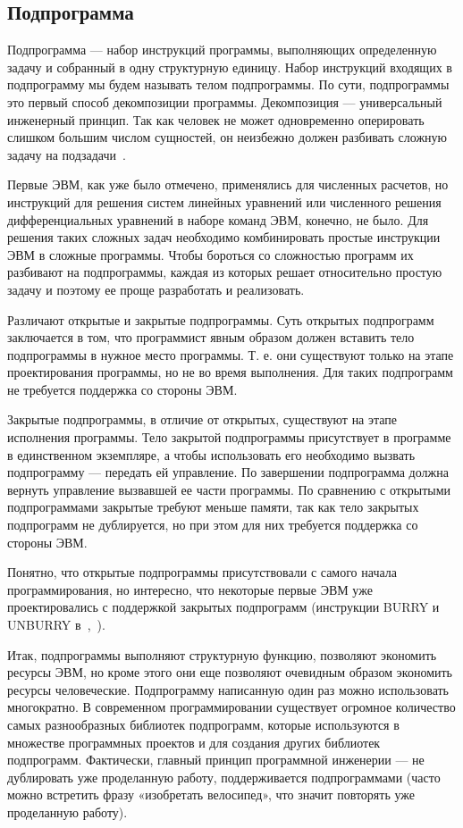 \subsection{Подпрограмма}

Подпрограмма — набор инструкций программы, выполняющих определенную задачу и собранный в одну структурную единицу. Набор инструкций входящих в подпрограмму мы будем называть телом подпрограммы. По сути, подпрограммы это первый способ декомпозиции программы. Декомпозиция — универсальный инженерный принцип. Так как человек не может одновременно оперировать слишком большим числом сущностей, он неизбежно должен разбивать сложную задачу на подзадачи~\cite{Miller}.

Первые ЭВМ, как уже было отмечено, применялись для численных расчетов, но инструкций для решения систем линейных уравнений или численного решения дифференциальных уравнений в наборе команд ЭВМ, конечно, не было. Для решения таких сложных задач необходимо комбинировать простые инструкции ЭВМ в сложные программы.  Чтобы бороться со сложностью программ их разбивают на подпрограммы, каждая из которых решает относительно простую задачу и поэтому ее проще разработать и реализовать.

Различают открытые и закрытые подпрограммы. Суть открытых подпрограмм заключается в том, что программист явным образом должен вставить тело подпрограммы в нужное место программы. Т. е. они существуют только на этапе проектирования программы, но не во время выполнения. Для таких подпрограмм не требуется поддержка со стороны ЭВМ.

Закрытые подпрограммы, в отличие от открытых, существуют на этапе исполнения программы. Тело закрытой подпрограммы присутствует в программе в единственном экземпляре, а чтобы использовать его необходимо вызвать подпрограмму — передать ей управление. По завершении подпрограмма должна вернуть управление вызвавшей ее части программы. По сравнению с открытыми подпрограммами закрытые требуют меньше памяти, так как тело закрытых подпрограмм не дублируется, но при этом для них требуется поддержка со стороны ЭВМ.

Понятно, что открытые подпрограммы присутствовали с самого начала программирования, но интересно, что некоторые первые ЭВМ уже проектировались с поддержкой закрытых подпрограмм (инструкции BURRY и UNBURRY в~\cite{Turing},~\cite{Dijkstra:1972:HP}).

Итак, подпрограммы выполняют структурную функцию, позволяют экономить ресурсы ЭВМ, но кроме этого они еще позволяют очевидным образом экономить ресурсы человеческие. Подпрограмму написанную один раз можно использовать многократно. В современном программировании существует огромное количество самых разнообразных библиотек подпрограмм, которые используются в множестве программных проектов и для создания других библиотек подпрограмм. Фактически, главный принцип программной инженерии — не дублировать уже проделанную работу, поддерживается подпрограммами (часто можно встретить фразу «изобретать велосипед», что значит повторять уже проделанную работу).

